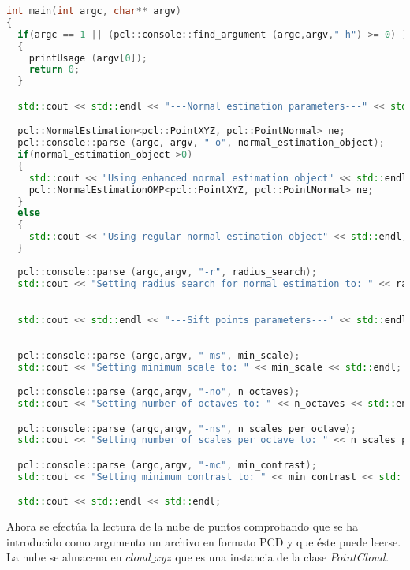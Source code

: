 
\begin{lstlisting}[language=C++,breaklines]
int main(int argc, char** argv)
{
  if(argc == 1 || (pcl::console::find_argument (argc,argv,"-h") >= 0) )
  {
	printUsage (argv[0]);
	return 0;
  }	

  std::cout << std::endl << "---Normal estimation parameters---" << std::endl;

  pcl::NormalEstimation<pcl::PointXYZ, pcl::PointNormal> ne;
  pcl::console::parse (argc, argv, "-o", normal_estimation_object);
  if(normal_estimation_object >0)
  {
	std::cout << "Using enhanced normal estimation object" << std::endl;
	pcl::NormalEstimationOMP<pcl::PointXYZ, pcl::PointNormal> ne;
  }
  else
  {
	std::cout << "Using regular normal estimation object" << std::endl;
  }
  
  pcl::console::parse (argc,argv, "-r", radius_search);
  std::cout << "Setting radius search for normal estimation to: " << radius_search << std::endl;

  
  std::cout << std::endl << "---Sift points parameters---" << std::endl;
  
  
  pcl::console::parse (argc,argv, "-ms", min_scale);
  std::cout << "Setting minimum scale to: " << min_scale << std::endl;

  pcl::console::parse (argc,argv, "-no", n_octaves);
  std::cout << "Setting number of octaves to: " << n_octaves << std::endl;

  pcl::console::parse (argc,argv, "-ns", n_scales_per_octave);
  std::cout << "Setting number of scales per octave to: " << n_scales_per_octave << std::endl;

  pcl::console::parse (argc,argv, "-mc", min_contrast);
  std::cout << "Setting minimum contrast to: " << min_contrast << std::endl;

  std::cout << std::endl << std::endl;
\end{lstlisting}

Ahora se efectúa la lectura de la nube de puntos comprobando que se ha introducido como argumento un archivo en formato PCD y que éste puede leerse. La nube se almacena en $cloud\_xyz$ que es una instancia de la clase $PointCloud$.

